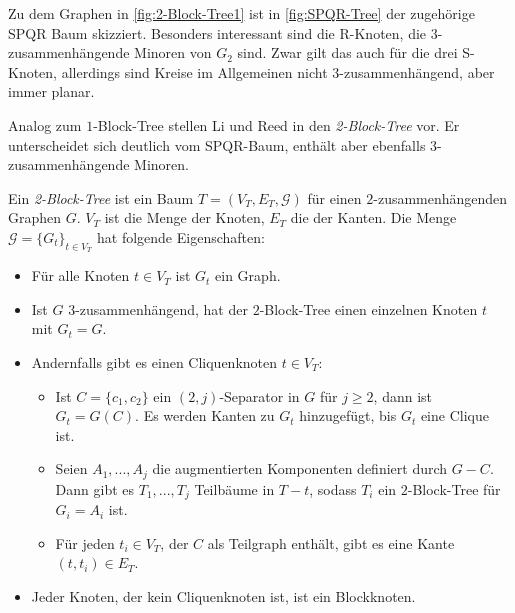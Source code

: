 Zu dem Graphen in \Abb \ref{fig:2-Block-Tree1} ist in \Abb \ref{fig:SPQR-Tree} der zugehörige SPQR Baum skizziert.
Besonders interessant sind die R-Knoten, die $3$-zusammenhängende Minoren von $G_2$ sind.
Zwar gilt das auch für die drei S-Knoten, allerdings sind Kreise im Allgemeinen nicht $3$-zusammenhängend, aber immer planar.

Analog zum $1$-Block-Tree stellen Li und Reed in \cite{ReL08} den \emph{2-Block-Tree} vor.
Er unterscheidet sich deutlich vom SPQR-Baum, enthält aber ebenfalls $3$-zusammenhängende Minoren.

\begin{definition}
Ein \emph{2-Block-Tree} ist ein Baum $T = (V_T, E_T, \mathcal{G})$ für einen $2$-zusammenhängenden Graphen $G$.
$V_T$ ist die Menge der Knoten, $E_T$ die der Kanten.
Die Menge $\mathcal{G} = \{G_t\}_{t \in V_T}$ hat folgende Eigenschaften:
\begin{itemize}
  \item Für alle Knoten $t \in V_T$ ist $G_t$ ein Graph.
  \item Ist $G$ $3$-zusammenhängend, hat der $2$-Block-Tree einen einzelnen Knoten $t$ mit $G_t = G$.
  \item Andernfalls gibt es einen Cliquenknoten $t \in V_T$:
  \begin{itemize}
    \item Ist $C = \{c_1, c_2\}$ ein $(2, j)$-Separator in $G$ für $j \geq 2$, dann ist $G_t = G(C)$.
          Es werden Kanten zu $G_t$ hinzugefügt, bis $G_t$ eine Clique ist.
    \item Seien $A_1, ..., A_j$ die augmentierten Komponenten definiert durch $G - C$.
          Dann gibt es $T_1, ..., T_j$ Teilbäume in $T - t$, sodass $T_i$ ein $2$-Block-Tree für $G_i = A_i$ ist.
    \item Für jeden $t_i \in V_T$, der $C$ als Teilgraph enthält, gibt es eine Kante $(t, t_i) \in E_T$.
  \end{itemize}
  \item Jeder Knoten, der kein Cliquenknoten ist, ist ein Blockknoten.
\end{itemize}
\end{definition}

